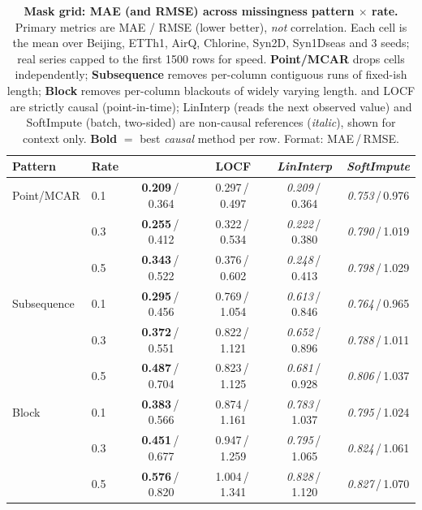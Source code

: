 \begin{table}[tbp]\centering\small
\setlength{\tabcolsep}{4pt}
\caption{\textbf{Mask grid: MAE (and RMSE) across missingness pattern $\times$ rate.} Primary metrics are MAE / RMSE (lower better), \emph{not} correlation. Each cell is the mean over Beijing, ETTh1, AirQ, Chlorine, Syn2D, Syn1Dseas and 3 seeds; real series capped to the first 1500 rows for speed. \textbf{Point/MCAR} drops cells independently; \textbf{Subsequence} removes per-column contiguous runs of fixed-ish length; \textbf{Block} removes per-column blackouts of widely varying length. \cafe{} and LOCF are strictly causal (point-in-time); LinInterp (reads the next observed value) and SoftImpute (batch, two-sided) are non-causal references (\emph{italic}), shown for context only. \textbf{Bold} $=$ best \emph{causal} method per row. Format: MAE\,/\,RMSE.}
\label{tab:maskgrid}
\begin{tabular}{@{}llcccc@{}}
\toprule
Pattern & Rate & \cafe{} & LOCF & \textit{LinInterp} & \textit{SoftImpute} \\
\midrule
Point/MCAR & 0.1 & \textbf{0.209}\,/\,0.364 & 0.297\,/\,0.497 & \textit{0.209}\,/\,0.364 & \textit{0.753}\,/\,0.976 \\
 & 0.3 & \textbf{0.255}\,/\,0.412 & 0.322\,/\,0.534 & \textit{0.222}\,/\,0.380 & \textit{0.790}\,/\,1.019 \\
 & 0.5 & \textbf{0.343}\,/\,0.522 & 0.376\,/\,0.602 & \textit{0.248}\,/\,0.413 & \textit{0.798}\,/\,1.029 \\
\midrule
Subsequence & 0.1 & \textbf{0.295}\,/\,0.456 & 0.769\,/\,1.054 & \textit{0.613}\,/\,0.846 & \textit{0.764}\,/\,0.965 \\
 & 0.3 & \textbf{0.372}\,/\,0.551 & 0.822\,/\,1.121 & \textit{0.652}\,/\,0.896 & \textit{0.788}\,/\,1.011 \\
 & 0.5 & \textbf{0.487}\,/\,0.704 & 0.823\,/\,1.125 & \textit{0.681}\,/\,0.928 & \textit{0.806}\,/\,1.037 \\
\midrule
Block & 0.1 & \textbf{0.383}\,/\,0.566 & 0.874\,/\,1.161 & \textit{0.783}\,/\,1.037 & \textit{0.795}\,/\,1.024 \\
 & 0.3 & \textbf{0.451}\,/\,0.677 & 0.947\,/\,1.259 & \textit{0.795}\,/\,1.065 & \textit{0.824}\,/\,1.061 \\
 & 0.5 & \textbf{0.576}\,/\,0.820 & 1.004\,/\,1.341 & \textit{0.828}\,/\,1.120 & \textit{0.827}\,/\,1.070 \\
\bottomrule
\end{tabular}
\\[6pt]
{\small
}
\end{table}
